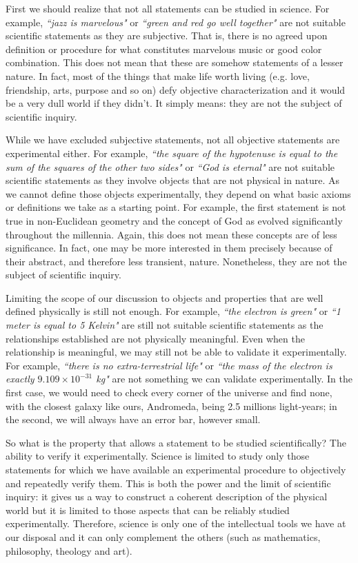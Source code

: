 \documentclass[11pt,letterpaper,fleqn]{memoir} %
\begin{document}
First we should realize that not all statements can be studied in science. For example, \emph{``jazz is marvelous"} or \emph{``green and red go well together"} are not suitable scientific statements as they are subjective. That is, there is no agreed upon definition or procedure for what constitutes marvelous music or good color combination. This does not mean that these are somehow statements of a lesser nature. In fact, most of the things that make life worth living (e.g. love, friendship, arts, purpose and so on) defy objective characterization and it would be a very dull world if they didn't. It simply means: they are not the subject of scientific inquiry.

While we have excluded subjective statements, not all objective statements are experimental either. For example, \emph{``the square of the hypotenuse is equal to the sum of the squares of the other two sides"} or \emph{``God is eternal"} are not suitable scientific statements as they involve objects that are not physical in nature. As we cannot define those objects experimentally, they depend on what basic axioms or definitions we take as a starting point. For example, the first statement is not true in non-Euclidean geometry and the concept of God as evolved significantly throughout the millennia. Again, this does not mean these concepts are of less significance. In fact, one may be more interested in them precisely because of their abstract, and therefore less transient, nature. Nonetheless, they are not the subject of scientific inquiry.

Limiting the scope of our discussion to objects and properties that are well defined physically is still not enough. For example, \emph{``the electron is green"} or \emph{``1 meter is equal to 5 Kelvin"} are still not suitable scientific statements as the relationships established are not physically meaningful. Even when the relationship is meaningful, we may still not be able to validate it experimentally. For example, \emph{``there is no extra-terrestrial life"} or \emph{``the mass of the electron is exactly $9.109 \times 10^{-31}$ kg"} are not something we can validate experimentally. In the first case, we would need to check every corner of the universe and find none, with the closest galaxy like ours, Andromeda, being 2.5 millions light-years; in the second, we will always have an error bar, however small.

So what is the property that allows a statement to be studied scientifically? The ability to verify it experimentally. Science is limited to study only those statements for which we have available an experimental procedure to objectively and repeatedly verify them. This is both the power and the limit of scientific inquiry: it gives us a way to construct a coherent description of the physical world but it is limited to those aspects that can be reliably studied experimentally. Therefore, science is only one of the intellectual tools we have at our disposal and it can only complement the others (such as mathematics, philosophy, theology and art).
\end{document}
